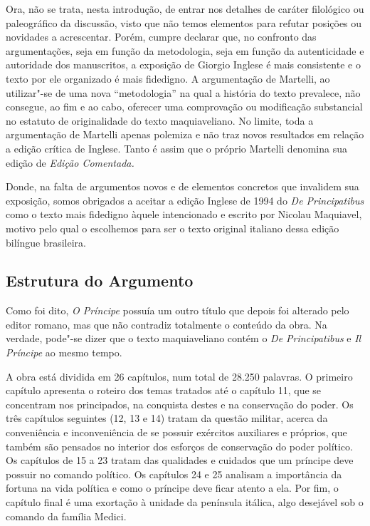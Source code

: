 Ora, não se trata, nesta introdução, de entrar nos detalhes de caráter
filológico ou paleográfico da discussão, visto que não temos elementos
para refutar posições ou novidades a acrescentar. Porém, cumpre declarar
que, no confronto das argumentações, seja em função da metodologia, seja
em função da autenticidade e autoridade dos manuscritos, a exposição de
Giorgio Inglese é mais consistente e o texto por ele organizado é mais
fidedigno. A argumentação de Martelli, ao utilizar"-se de uma nova
``metodologia'' na qual a história do texto prevalece, não consegue, ao
fim e ao cabo, oferecer uma comprovação ou modificação substancial no
estatuto de originalidade do texto maquiaveliano. No limite, toda a
argumentação de Martelli apenas polemiza e não traz novos resultados em
relação a edição crítica de Inglese. Tanto é assim que o próprio
Martelli denomina sua edição de \emph{Edição Comentada.}

Donde, na falta de argumentos novos e de elementos concretos que
invalidem sua exposição, somos obrigados a aceitar a edição Inglese de
1994 do \emph{De Principatibus} como o texto mais fidedigno àquele
intencionado e escrito por Nicolau Maquiavel, motivo pelo qual o
escolhemos para ser o texto original italiano dessa edição bilíngue
brasileira.

\subsection{Estrutura do Argumento}

Como foi dito, \emph{O Príncipe} possuía um outro título que depois foi
alterado pelo editor romano, mas que não contradiz totalmente o conteúdo
da obra. Na verdade, pode"-se dizer que o texto maquiaveliano contém o
\emph{De Principatibus} e \emph{Il Príncipe} ao mesmo tempo.

A obra está dividida em 26 capítulos, num total de 28.250 palavras. O
primeiro capítulo apresenta o roteiro dos temas tratados até o capítulo
11, que se concentram nos principados, na conquista destes e na
conservação do poder. Os três capítulos seguintes (12, 13 e 14) tratam
da questão militar, acerca da conveniência e inconveniência de se
possuir exércitos auxiliares e próprios, que também são pensados no
interior dos esforços de conservação do poder político. Os capítulos de
15 a 23 tratam das qualidades e cuidados que um príncipe deve possuir no
comando político. Os capítulos 24 e 25 analisam a importância da fortuna
na vida política e como o príncipe deve ficar atento a ela. Por fim, o
capítulo final é uma exortação à unidade da península itálica, algo
desejável sob o comando da família Medici.

